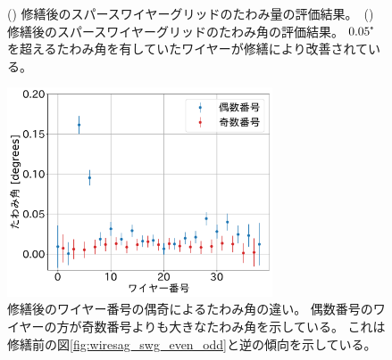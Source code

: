\documentclass[../../main.tex]{subfiles}
\begin{document}
\begin{figure}[H]
\begin{minipage}[b]{0.5\hsize}
        \subcaption{}
        \label{fig:wiresag_swg_sag_angle_result_repair}
    \end{minipage}
    \caption{() 修繕後のスパースワイヤーグリッドのたわみ量の評価結果。\ 
             () 修繕後のスパースワイヤーグリッドのたわみ角の評価結果。
             $0.05\tcdegree$を超えるたわみ角を有していたワイヤーが修繕により改善されている。}
    \label{fig:wiresag_swg_result_repair}
\end{figure}
\begin{figure}[H]
    \centering
    \includegraphics[width=0.7\textwidth]{wiresag_swg/swg_sag_angle_after_even_odd.pdf}
    \caption{修繕後のワイヤー番号の偶奇によるたわみ角の違い。
    偶数番号のワイヤーの方が奇数番号よりも大きなたわみ角を示している。
    これは修繕前の図\ref{fig:wiresag_swg_even_odd}と逆の傾向を示している。
    }
    \label{fig:wiresag_swg_even_odd_repair}
\end{figure}
\end{document}
